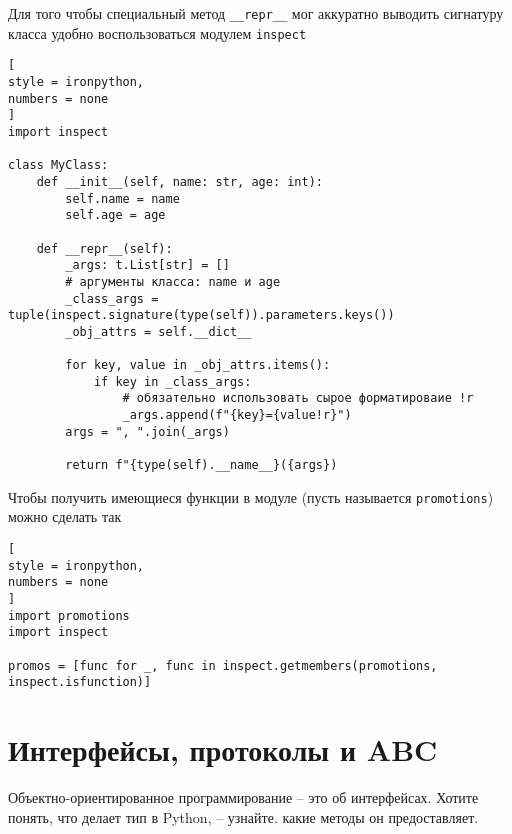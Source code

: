 \documentclass[%
	11pt,
	a4paper,
	utf8,
		]{article}
\begin{document}
Для того чтобы специальный метод \verb|__repr__| мог аккуратно выводить сигнатуру класса удобно воспользоваться модулем \verb|inspect|
\begin{lstlisting}[
style = ironpython,
numbers = none
]
import inspect

class MyClass:
    def __init__(self, name: str, age: int):
        self.name = name
        self.age = age
        
    def __repr__(self):
        _args: t.List[str] = []
        # аргументы класса: name и age
        _class_args = tuple(inspect.signature(type(self)).parameters.keys())
        _obj_attrs = self.__dict__
        
        for key, value in _obj_attrs.items():
            if key in _class_args:
                # обязательно использовать сырое форматироваие !r
                _args.append(f"{key}={value!r}")  
        args = ", ".join(_args)
        
        return f"{type(self).__name__}({args})
\end{lstlisting}

Чтобы получить имеющиеся функции в модуле (пусть называется \verb*|promotions|) можно сделать так \cite[]{ramalho:python-2022}
\begin{lstlisting}[
style = ironpython,
numbers = none
]
import promotions
import inspect

promos = [func for _, func in inspect.getmembers(promotions, inspect.isfunction)]
\end{lstlisting}

\section{ Интерфейсы, протоколы и ABC}

Объектно-ориентированное программирование -- это об интерфейсах. Хотите понять, что делает тип в Python, -- узнайте. какие методы он предоставляет.
\end{document}
